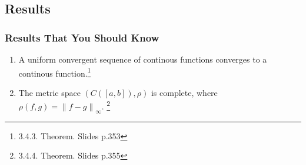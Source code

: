 \documentclass[10pt, t]{beamer}
\begin{document}
\subsection{Results}
\begin{frame}
    \frametitle{Results That You Should Know}

    \begin{enumerate}
        \item A uniform convergent sequence of continous functions converges to a continous function.\footnote[frame]{3.4.3. Theorem. Slides p.353}
        \item The metric space $(C([a,b]),\rho)$ is complete, where $\rho(f,g)=\left\|f - g\right\|_\infty$. \footnote[frame]{3.4.4. Theorem. Slides p.355}
    \end{enumerate}
\end{frame}
\end{document}
